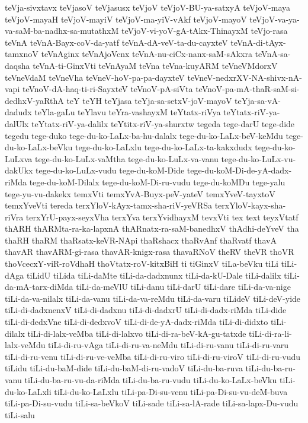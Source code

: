 {teVja-sivxtavx
teVjasoV
teVjasusx
teVjoV
teVjoV-BU-ya-satxyA
teVjoV-maya
teVjoV-mayaH
teVjoV-mayiV
teVjoV-ma-yiV-vAkf
teVjoV-mayoV
teVjoV-va-ya-va-saM-ba-nadhx-sa-mutathxM
teVjoV-vi-yoV-gA-tAkx-ThinayxM
teVjo-rasa
teVnA
teVnA-Bayx-coV-da-yatf
teVnA-dA-veV-ta-du-cayxteV
teVnA-di-tAyx-tamxnoV
teVnAginx
teVnAjoVcnx
teVnA-nu-ciCx-nanx-saM-sAkxra
teVnA-sa-daqsha
teVnA-ti-GinxVti
teVnAyaM
teVna
teVna-kuyARM
teVneVMdorxV
teVneVdaM
teVneVha
teVneV-hoV-pa-pa-dayxteV
teVneV-nedxrXV-NA-shivx-nA-vapi
teVnoV-dA-haq-ti-ri-SayxteV
teVnoV-pA-siVta
teVnoV-pa-mA-thaR-saM-si-dedhxV-yaRthA
teY
teYH
teYjasa
teYja-sa-setxV-joV-mayoV
teYja-sa-vA-dadudx
teYla-gaLu
teYlavu
teYra-vashayxM
teYtatx-riVya
teYtatx-riV-ya-dalUlx
teYtatx-riV-ya-dalilx
teYtitx-riV-ya-shurxtw
tegeda
tege-darU
tege-dide
tegedu
tege-duko
tege-du-ko-LaLx-ba-hu-dalalx
tege-du-ko-LaLx-beV-keMdu
tege-du-ko-LaLx-beVku
tege-du-ko-LaLxlu
tege-du-ko-LaLx-ta-kakxdudx
tege-du-ko-LuLxva
tege-du-ko-LuLx-vaMtha
tege-du-ko-LuLx-va-vanu
tege-du-ko-LuLx-vu-dakUkx
tege-du-ko-LuLx-vudu
tege-du-koM-Dide
tege-du-koM-Di-de-yA-dadx-riMda
tege-du-koM-Dilalx
tege-du-koM-Di-ru-vudu
tege-du-koMDu
tege-yalu
tege-yu-vu-dakekx
temxVti
temxYvA-Buyx-peV-yateV
temxYveV-tayxtoV
temxYveVti
tereda
terxYloV-kAyx-tamx-sha-riV-yeVRSa
terxYloV-kayx-sha-riVra
terxYrU-payx-seyxVha
terxYva
terxYvidhayxM
tevxVti
tex
text
teyxVtatf
thARH
thARMta-ra-ka-lapxnA
thARnatx-ra-saM-banedhxV
thAdhi-deYveV
tha
thaRH
thaRM
thaRsatx-keVR-NApi
thaRshacx
thaRvAnf
thaRvatf
thavA
thavAR
thavARM-gi-rasa
thavAR-knigx-rasa
thavaRNoV
theRV
theVR
thoVR
thoVcecxY-viR-roVdhaH
thoVtatx-roV-kitxBiH
ti
tiGinxV
tiLa-beVku
tiLi
tiLi-dAga
tiLidU
tiLida
tiLi-daMte
tiLi-da-dadxnunx
tiLi-da-kU-Dale
tiLi-dalilx
tiLi-da-mA-tarx-diMda
tiLi-da-meVlU
tiLi-danu
tiLi-darU
tiLi-dare
tiLi-da-va-nige
tiLi-da-va-nilalx
tiLi-da-vanu
tiLi-da-va-reMdu
tiLi-da-varu
tiLideV
tiLi-deV-yide
tiLi-di-dadxnenxV
tiLi-di-dadxnu
tiLi-di-dadxrU
tiLi-di-dadx-riMda
tiLi-dide
tiLi-di-dedxVne
tiLi-di-dedxvoV
tiLi-di-de-yA-dadx-riMda
tiLi-di-didxto
tiLi-dilalx
tiLi-di-lalx-veMba
tiLi-di-lalxvo
tiLi-di-ra-beV-kA-gu-tatxde
tiLi-di-ra-li-lalx-veMdu
tiLi-di-ru-vAga
tiLi-di-ru-va-neMdu
tiLi-di-ru-vanu
tiLi-di-ru-varu
tiLi-di-ru-venu
tiLi-di-ru-ve-veMba
tiLi-di-ru-viro
tiLi-di-ru-viroV
tiLi-di-ru-vudu
tiLidu
tiLi-du-baM-dide
tiLi-du-baM-di-ru-vadoV
tiLi-du-ba-ruva
tiLi-du-ba-ru-vanu
tiLi-du-ba-ru-vu-da-riMda
tiLi-du-ba-ru-vudu
tiLi-du-ko-LaLx-beVku
tiLi-du-ko-LaLxli
tiLi-du-ko-LaLxlu
tiLi-pa-Di-su-venu
tiLi-pa-Di-su-vu-deM-buva
tiLi-pa-Di-su-vudu
tiLi-sa-beVkoV
tiLi-sade
tiLi-sa-lA-rade
tiLi-sa-lapx-Du-vudu
tiLi-salu
}
